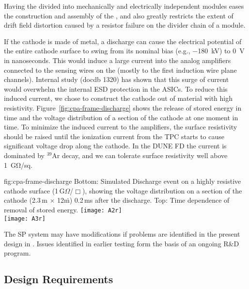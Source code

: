 Having the  divided into mechanically and electrically independent modules eases the construction and assembly of the , and also greatly restricts the extent of drift field distortion caused by a resistor failure on the divider chain of a  module.

If the cathode is made of metal, a  discharge can cause the electrical potential of the entire cathode surface to swing from its nominal bias (e.g., \SI{-180}{kV}) to \SI{0}{V} in nanoseconds. This would induce a large current into the analog  amplifiers connected to the sensing wires on the  (mostly to the first induction wire plane channels). Internal study (docdb 1320) has shown that this surge of current would overwhelm the internal ESD protection in the  ASICs.  To reduce this induced current, we chose to construct the cathode out of material with high resistivity.  Figure~\ref{fig:cpa-frame-discharge} shows the release of stored energy in time and the voltage distribution of a section of the cathode at one moment in time.  To minimize the induced current to the amplifiers, the surface resistivity should be raised until the ionization current from the TPC starts to cause significant voltage drop along the cathode.  In the DUNE FD the current is dominated by $^{39}$Ar decay, and we can tolerate surface resistivity well above \SI{1}{\giga\ohm/sq}. 


\begin{dunefigure}
{fig:cpa-frame-discharge}
{Bottom: Simulated  Discharge event on a highly resistive cathode surface (1\,G$\Omega$/$\Box$), showing the voltage distribution on a section of the cathode (2.3\,m $\times$ 12\.m) 0.2\,ms after the discharge. Top: Time dependence of removal of stored energy.}
\centering
\texttt{[image: A2r]} \\ \vspace{30pt}    %
\texttt{[image: A3r]}
\end{dunefigure}

The SP  system may have modifications if problems are identified in the present design in . Issues identified in earlier testing form the basis of an ongoing R\&D program.


\subsection{Design Requirements}
\label{sec:fdsp-hv-des-consid}

